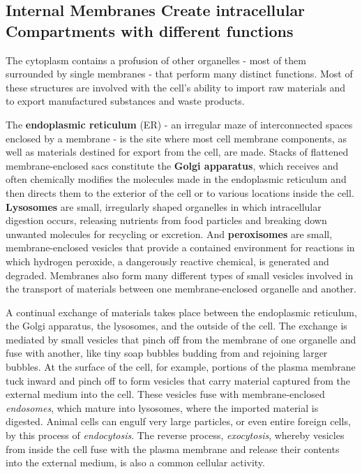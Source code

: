 \subsection{Internal Membranes Create intracellular Compartments with different functions}

The cytoplasm contains a profusion of other organelles - most of them surrounded
by single membranes - that perform many distinct functions. Most of these structures
are involved with the cell’s ability to import raw materials and to export
manufactured substances and waste products.

The \textbf{endoplasmic reticulum} (ER) - an irregular maze of interconnected
spaces enclosed by a membrane - is the site where most
cell membrane components, as well as materials destined for export
from the cell, are made. Stacks of flattened membrane-enclosed sacs
constitute the \textbf{Golgi apparatus}, which receives and often
chemically modifies the molecules made in the endoplasmic reticulum
and then directs them to the exterior of the cell or to various locations
inside the cell. \textbf{Lysosomes} are small, irregularly shaped organelles in
which intracellular digestion occurs, releasing nutrients from food particles
and breaking down unwanted molecules for recycling or excretion.
And \textbf{peroxisomes} are small, membrane-enclosed vesicles that provide a
contained environment for reactions in which hydrogen peroxide, a dangerously
reactive chemical, is generated and degraded. Membranes also
form many different types of small vesicles involved in the transport of
materials between one membrane-enclosed organelle and another.

A continual exchange of materials takes place between the endoplasmic
reticulum, the Golgi apparatus, the lysosomes, and the outside of the
cell. The exchange is mediated by small vesicles that pinch off from the
membrane of one organelle and fuse with another, like tiny soap bubbles
budding from and rejoining larger bubbles. At the surface of the cell, for
example, portions of the plasma membrane tuck inward and pinch off
to form vesicles that carry material captured from the external medium
into the cell. These vesicles fuse with membrane-enclosed
\textit{endosomes}, which mature into lysosomes, where the imported material
is digested. Animal cells can engulf very large particles, or even entire
foreign cells, by this process of \textit{endocytosis}. The reverse process, \textit{exocytosis},
whereby vesicles from inside the cell fuse with the plasma membrane
and release their contents into the external medium, is also a common
cellular activity.

